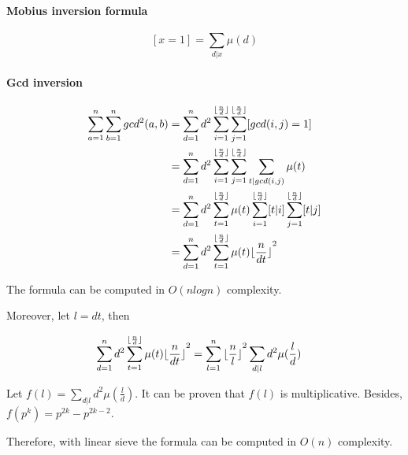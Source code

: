 \paragraph{Mobius inversion formula}

$$[x = 1] = \sum_{d|x}\mu(d)$$

\paragraph{Gcd inversion}
\begin{align*}
\sum_{a=1}^n\sum_{b=1}^ngcd^2(a,b)&=\sum_{d=1}^nd^2\sum_{i=1}^{\lfloor\frac{n}{d}\rfloor}\sum_{j=1}^{\lfloor\frac{n}{d}\rfloor}[gcd(i,j)=1]\\
&=\sum_{d=1}^nd^2\sum_{i=1}^{\lfloor\frac{n}{d}\rfloor}\sum_{j=1}^{\lfloor\frac{n}{d}\rfloor}\sum_{t|gcd(i,j)}\mu(t)\\
&=\sum_{d=1}^nd^2\sum_{t=1}^{\lfloor\frac{n}{d}\rfloor}\mu(t)\sum_{i=1}^{\lfloor\frac{n}{d}\rfloor}[t|i]\sum_{j=1}^{\lfloor\frac{n}{d}\rfloor}[t|j]\\
&=\sum_{d=1}^nd^2\sum_{t=1}^{\lfloor\frac{n}{d}\rfloor}\mu(t){\lfloor\frac{n}{dt}\rfloor}^2
\end{align*}

The formula can be computed in $O(nlogn)$ complexity.

Moreover, let $l=dt$, then

\begin{align*}
\sum_{d=1}^nd^2\sum_{t=1}^{\lfloor\frac{n}{d}\rfloor}\mu(t){\lfloor\frac{n}{dt}\rfloor}^2&=\sum_{l=1}^n{\lfloor\frac{n}{l}\rfloor}^2\sum_{d|l}d^2\mu(\frac{l}{d})
\end{align*}

Let $f(l)=\sum_{d|l}d^2\mu(\frac{l}{d})$. It can be proven that $f(l)$ is multiplicative. Besides, $f(p^k)=p^{2k}-p^{2k-2}$.

Therefore, with linear sieve the formula can be computed in $O(n)$ complexity.

